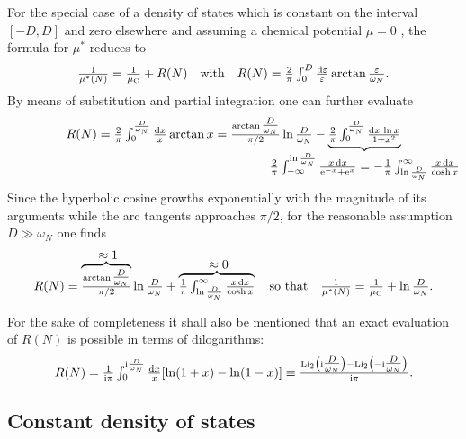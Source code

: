 For the special case of a density of states which is constant on the interval
$[-D, D]$ and zero elsewhere and assuming a chemical potential $\mu = 0$
\cite[39]{AllenMitrovic82}, the formula for $\mu^*$ reduces to
%
\begin{equation*}
    \frac 1 {\mu^*(N)} = \frac 1 {\mu \sub C} + R(N)
    \quad \text{with} \quad
    R(N) = \frac 2 \pi \int_0^D \frac {\D \epsilon} \epsilon
    \arctan \frac \epsilon {\omega_N}.
\end{equation*}
%
By means of substitution and partial integration one can further evaluate
%
\begin{equation*}
    R(N) = \frac 2 \pi \int_0^{\frac D {\omega_N}} \frac {\D x} x \arctan x
    = \frac{\arctan \tfrac D {\omega_N}}{\pi / 2} \ln \frac D {\omega_N}
    - \hypo
        {\frac 2 \pi \int_0^{\frac D {\omega_N}} \frac{\D x \, \ln x}{1 + x^2}}
        { \frac 2 \pi \int_{-\infty}^{\ln \frac D {\omega_N}}
        \frac{x \, \D x}{\E^{-x} + \E^x}
        = -\frac 1 \pi \int_{\ln \frac D {\omega_N}}^\infty
        \frac{x \, \D x}{\cosh x} }
\end{equation*}
%
Since the hyperbolic cosine growths exponentially with the magnitude of its
arguments while the arc tangents approaches $\pi / 2$, for the reasonable
assumption $D \gg \omega_N$ one finds
%
\begin{equation} \label{rectangular-DOS mu*}
R(N) = \hyper{\frac{\arctan \tfrac D {\omega_N}}{\pi / 2}}{\approx 1}
\ln \frac D {\omega_N}
+ \hyper{
    \frac 1 \pi \int_{\ln \frac D {\omega_N}}^\infty
    \frac{x \, \D x}{\cosh x}
    }
    {\approx 0}
\quad \text{so that} \quad
\frac 1 {\mu^*(N)} = \frac 1 {\mu \sub C} + \ln \frac D {\omega_N}.
\end{equation}

For the sake of completeness it shall also be mentioned that an exact evaluation
of $R(N)$ is possible in terms of dilogarithms:
%
\begin{equation*}
    R(N) = \frac 1 {\I \pi} \int_0^{\I \frac D {\omega_N}} \frac {\D x} x
    [\ln(1 + x) - \ln(1 - x)]
    \equiv \frac
        { \mathrm{Li}_2 \big(  \I \tfrac D {\omega_N} \big)
        - \mathrm{Li}_2 \big( -\I \tfrac D {\omega_N} \big) }
        {\I \pi}.
\end{equation*}

\subsection{Constant density of states}

